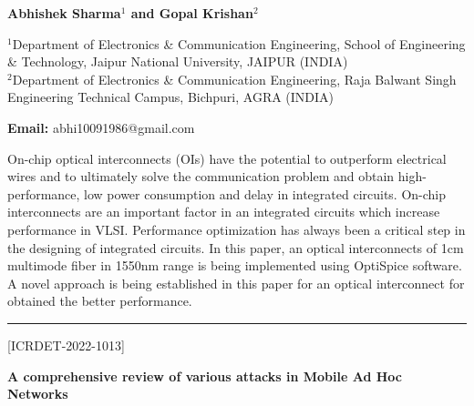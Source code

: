 \documentclass[twoside,11pt]{amsart}
\begin{document}
\centerline{\textbf{Abhishek Sharma$^{1}$ and Gopal Krishan$^{2}$}}
\vskip 5mm
\newpage
\begin{flushleft}
$^{1}$Department of Electronics \& Communication Engineering, School of Engineering \&
Technology, Jaipur National University, JAIPUR (INDIA)
\\
$^{2}$Department of Electronics \& Communication Engineering, Raja Balwant Singh
Engineering Technical Campus, Bichpuri, AGRA (INDIA)
\vskip 5mm
\end{flushleft}
\vskip 2mm
\begin{flushleft}
{\bf Email:} abhi10091986@gmail.com
\end{flushleft}
On-chip optical interconnects (OIs) have the potential to outperform electrical wires and to ultimately solve the communication problem and obtain high-performance, low power consumption and delay in integrated circuits. On-chip interconnects are an important factor in an integrated circuits which increase performance in VLSI. Performance optimization has always been a critical step in the designing of integrated circuits. In this paper, an optical interconnects of 1cm multimode fiber in 1550nm range is being implemented using OptiSpice software. A novel approach is being established in this paper for an optical interconnect for obtained the better performance.
\vskip 5mm
\rule{\textwidth}{0.5pt}
\vskip 10mm
\begin{flushleft}
\centerline{[ICRDET-2022-1013]}
\end{flushleft}
\begin{center}\bf\LARGE
A comprehensive review of various attacks in Mobile Ad Hoc Networks
\end{center}
\vskip 5mm
\end{document}
